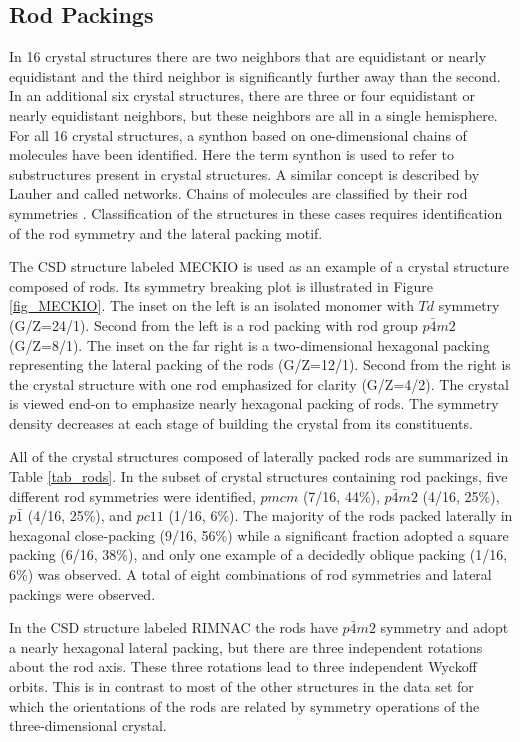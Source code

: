 \documentclass[preprint]{iucr}              %
\begin{document}
\subsection{Rod Packings}

In 16 crystal structures there are two neighbors that are equidistant or nearly
equidistant and the third neighbor is significantly further away than the second.  In an additional six crystal structures, there are three or four equidistant or nearly equidistant neighbors, but these neighbors are all in a single hemisphere.  For all 16 crystal structures, a synthon based on one-dimensional chains of molecules have been identified.  Here the term synthon is used to refer to substructures present in crystal structures.  A similar concept is described by Lauher \cite{Lauher04} and called networks.  Chains of molecules are classified by their rod symmetries \cite{Hahn02VolE}.  Classification of the structures in these cases requires identification of the rod symmetry and the lateral packing motif.

The CSD structure labeled MECKIO is used as an example of a crystal structure composed of rods.  Its symmetry breaking plot is illustrated in Figure \ref{fig_MECKIO}.  The inset on the left is an isolated monomer with $Td$ symmetry (G/Z=24/1).  Second from the left is a rod packing with rod group $p\bar{4}m2$ (G/Z=8/1).  The inset on the far right is a two-dimensional hexagonal packing representing the lateral packing of the rods (G/Z=12/1).  Second from the right is the crystal structure with one rod emphasized for clarity (G/Z=4/2).  The crystal is viewed end-on to emphasize nearly hexagonal packing of rods.  The symmetry density decreases at each stage of building the crystal from its constituents.  

All of the crystal structures composed of laterally packed rods are summarized in Table \ref{tab_rods}.  In the subset of crystal structures containing rod packings, five different rod symmetries were identified, $pmcm$ (7/16, 44\%), $p\bar{4}m2$ (4/16, 25\%), $p\bar{1}$ (4/16, 25\%), and $pc11$ (1/16, 6\%).  The majority of the rods packed laterally in hexagonal close-packing (9/16, 56\%) while a significant fraction adopted a square packing (6/16, 38\%), and only one example of a decidedly oblique packing (1/16, 6\%) was observed.  A total of eight combinations of rod symmetries and lateral packings were observed.

In the CSD structure labeled RIMNAC the rods have $p\bar{4}m2$ symmetry and adopt a nearly hexagonal lateral packing, but there are three independent rotations about the rod axis.  These three rotations lead to three independent Wyckoff orbits.  This is in contrast to most of the other structures in the data set for which the orientations of the rods are related by symmetry operations of the three-dimensional crystal.
\end{document}
